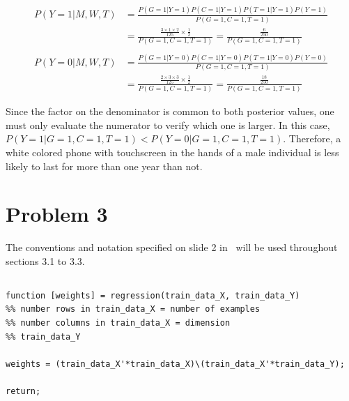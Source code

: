 \documentclass[paper=a4, fontsize=11pt]{scrartcl} %
\numberwithin{equation}{section} %
\numberwithin{figure}{section} %
\numberwithin{table}{section} %
\begin{document}
\begin{equation}
\begin{split}
    P(Y = 1|M,W,T)  &= \frac{P(G = 1|Y = 1)P(C = 1|Y = 1)P(T = 1|Y = 1)P(Y = 1)}{P(G = 1, C = 1,T = 1)}\\
                    &= \frac{\frac{3 \times 1 \times 2}{125} \times \frac{1}{2}}{P(G = 1, C = 1,T = 1)} = \frac{\frac{6}{250}}{P(G = 1, C = 1,T = 1)}\\     
\\
    P(Y = 0|M,W,T)  &= \frac{P(G = 1|Y = 0)P(C = 1|Y = 0)P(T = 1|Y = 0)P(Y = 0)}{P(G = 1, C = 1,T = 1)}\\
                    &= \frac{\frac{2 \times 3 \times 3}{125} \times \frac{1}{2}}{P(G = 1, C = 1,T = 1)} = \frac{\frac{18}{250}}{P(G = 1, C = 1,T = 1)}
    \label{eq:2-2-posteriors}
\end{split}
\end{equation}

Since the factor on the denominator is common to both posterior values, one 
must only evaluate the numerator to verify which one is larger. In this case, 
$P(Y = 1|G = 1, C = 1, T = 1) < P(Y = 0|G = 1, C = 1, T = 1)$. Therefore, a 
white colored phone with touchscreen in the hands of a male individual is less 
likely to last for more than one year than not.

\section{Problem 3}

The conventions and notation specified on slide 2 
in~\cite{Cardoso2013} will be used throughout sections 3.1 to 3.3.

\subsection{}
\label{subsec:3-1}

\begin{lstlisting}[label=lst:regression,caption={MATLAB function for calculating 
the coefficients of the linear regression on a given training dataset, 
composed by the arrays.}]
function [weights] = regression(train_data_X, train_data_Y)
%% number rows in train_data_X = number of examples
%% number columns in train_data_X = dimension
%% train_data_Y

weights = (train_data_X'*train_data_X)\(train_data_X'*train_data_Y);

return;

\end{lstlisting}
\end{document}
